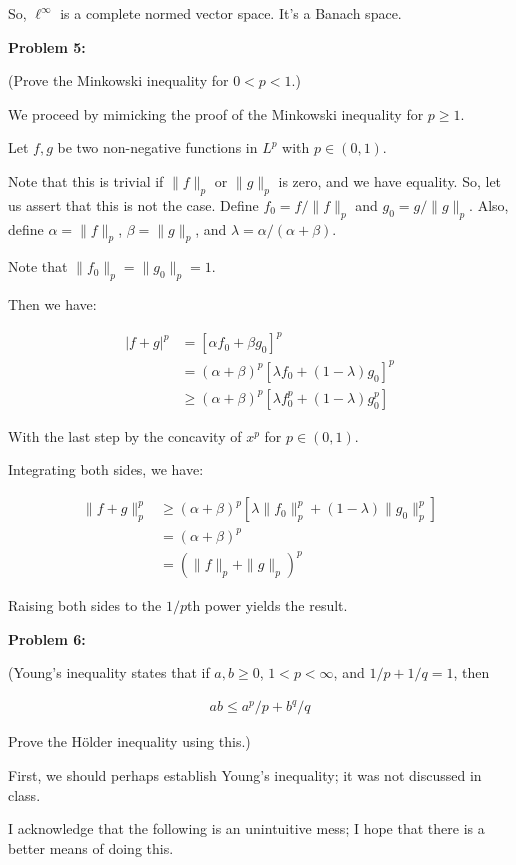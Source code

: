 \documentclass[a4paper,12pt]{article}
\newcommand{\shunt}{\vspace{20mm}}
\newcommand{\absval}[1]{\left\lvert #1 \right\rvert}
\newcommand{\norm}[1]{\|#1\|}
\newcommand{\al}{\alpha} %
\newcommand{\be}{\beta}
\newcommand{\la}{\lambda}
\begin{document}
So, $\ell^\infty$ is a complete normed vector space. It's a Banach space.

\shunt

{\bf Problem 5:} 

(Prove the Minkowski inequality for $0 < p < 1$.)

We proceed by mimicking the proof of the Minkowski inequality for $p \geq 1$. 

Let $f,g$ be two non-negative functions in $L^p$ with $p \in (0,1)$.

Note that this is trivial if $\norm{f}_p$ or $\norm{g}_p$ is zero, and we have equality. So, let us assert that this is not the case. Define $f_0=f/\norm{f}_p$ and $g_0=g/\norm{g}_p$. Also, define $\al = \norm{f}_p$, $\be=\norm{g}_p$, and $\la = \al/(\al+\be)$.

Note that $\norm{f_0}_p=\norm{g_0}_p=1$.

Then we have:

\begin{align*}
\absval{f+g}^p &= [\al f_0 + \be g_0]^p\\
&= (\al+\be)^p[\la f_0 + (1-\la) g_0]^p\\
&\geq (\al+\be)^p[\la f_0^p + (1-\la) g_0^p]
\end{align*}

With the last step by the concavity of $x^p$ for $p \in (0,1)$.

Integrating both sides, we have:

\begin{align*}
\norm{f+g}_p^p &\geq (\al+\be)^p[\la \norm{f_0}_p^p+(1-\la)\norm{g_0}_p^p]\\
&=(\al+\be)^p\\
&=(\norm{f}_p+\norm{g}_p)^p
\end{align*}

Raising both sides to the $1/p$th power yields the result. 

\shunt

{\bf Problem 6:} 

(Young's inequality states that if $a,b \geq 0$, $1 < p < \infty$, and $1/p + 1/q =1$, then

\begin{align*}
ab \leq a^p/p + b^q/q
\end{align*}

Prove the H{\"o}lder inequality using this.)

First, we should perhaps establish Young's inequality; it was not discussed in class.

I acknowledge that the following is an unintuitive mess; I hope that there is a better means of doing this.
\end{document}
